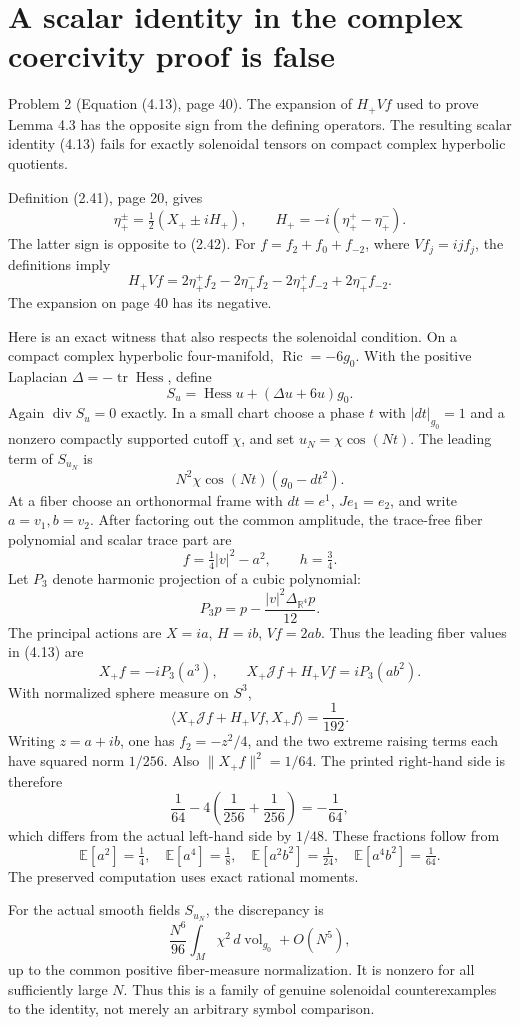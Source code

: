 \documentclass[10pt]{article}
\begin{document}
\section*{A scalar identity in the complex coercivity proof is false}
Problem 2 (Equation (4.13), page 40).  The expansion of \(H_+Vf\) used to prove Lemma 4.3 has the opposite sign from the defining operators. The resulting scalar identity (4.13) fails for exactly solenoidal tensors on compact complex hyperbolic quotients.\par
Definition (2.41), page 20, gives \[\eta^\pm_+=\tfrac12(X_+\pm iH_+),\qquad
 H_+=-i(\eta^+_+-\eta^-_+).\] The latter sign is opposite to (2.42). For \(f=f_2+f_0+f_{-2}\), where \(Vf_j=ij f_j\), the definitions imply \[H_+Vf=
 2\eta^+_+f_2-2\eta^-_+f_2
 -2\eta^+_+f_{-2}+2\eta^-_+f_{-2}.\] The expansion on page 40 has its negative.\par
Here is an exact witness that also respects the solenoidal condition. On a compact complex hyperbolic four-manifold, \(\operatorname{Ric}=-6g_0\). With the positive Laplacian \(\Delta=-\operatorname{tr}\operatorname{Hess}\), define \[S_u=\operatorname{Hess}u+(\Delta u+6u)g_0.\] Again \(\operatorname{div}S_u=0\) exactly. In a small chart choose a phase \(t\) with \(|dt|_{g_0}=1\) and a nonzero compactly supported cutoff \(\chi\), and set \(u_N=\chi\cos(Nt)\). The leading term of \(S_{u_N}\) is \[N^2\chi\cos(Nt)(g_0-dt^2).\] At a fiber choose an orthonormal frame with \(dt=e^1\), \(Je_1=e_2\), and write \(a=v_1,b=v_2\). After factoring out the common amplitude, the trace-free fiber polynomial and scalar trace part are \[f=\tfrac14|v|^2-a^2,\qquad h=\tfrac34.\] Let \(P_3\) denote harmonic projection of a cubic polynomial: \[P_3p=p-\frac{|v|^2\Delta_{\mathbb R^4}p}{12}.\] The principal actions are \(X=i a\), \(H=i b\), \(Vf=2ab\). Thus the leading fiber values in (4.13) are \[X_+f=-iP_3(a^3),\qquad
 X_+\mathcal Jf+H_+Vf=iP_3(ab^2).\] With normalized sphere measure on \(S^3\), \[\big\langle X_+\mathcal Jf+H_+Vf,X_+f\big\rangle
   =\frac1{192}.\] Writing \(z=a+ib\), one has \(f_2=-z^2/4\), and the two extreme raising terms each have squared norm \(1/256\). Also \(\|X_+f\|^2=1/64\). The printed right-hand side is therefore \[\frac1{64}-4\left(\frac1{256}+\frac1{256}\right)
 =-\frac1{64},\] which differs from the actual left-hand side by \(1/48\). These fractions follow from \[\mathbb E[a^2]=\tfrac14,\quad
 \mathbb E[a^4]=\tfrac18,\quad
 \mathbb E[a^2b^2]=\tfrac1{24},\quad
 \mathbb E[a^4b^2]=\tfrac1{64}.\] The preserved computation uses exact rational moments.\par
For the actual smooth fields \(S_{u_N}\), the discrepancy is \[\frac{N^6}{96}\int_M\chi^2\,d\operatorname{vol}_{g_0}
       +O(N^5),\] up to the common positive fiber-measure normalization. It is nonzero for all sufficiently large \(N\). Thus this is a family of genuine solenoidal counterexamples to the identity, not merely an arbitrary symbol comparison.\par
\end{document}
